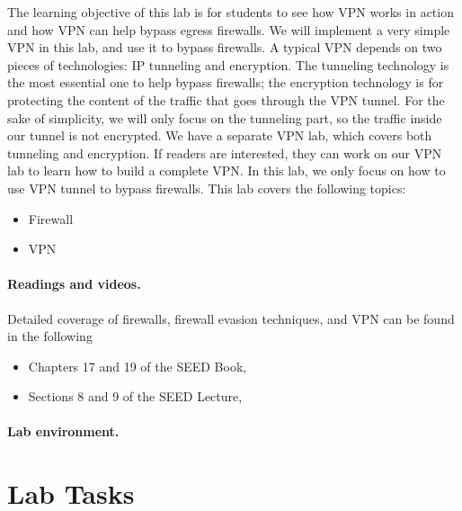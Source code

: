 The learning objective of this lab is for students to see 
how VPN works in action and how VPN can help bypass egress firewalls.     
We will implement a very simple VPN in this lab, and use it to bypass
firewalls. A typical VPN depends on two pieces of technologies: IP tunneling
and encryption. The tunneling technology is the most essential one to help
bypass firewalls; the encryption technology is for protecting the content
of the traffic that goes through the VPN tunnel. 
For the sake of simplicity, we will only focus on the tunneling part,
so the traffic inside our tunnel is not encrypted. We have a separate
VPN lab, which covers both tunneling and encryption. If readers are
interested, they can work on our VPN lab to learn how to build a complete
VPN. In this lab, we only focus on how to use VPN tunnel to bypass firewalls.
This lab covers the following topics:

\begin{itemize}[noitemsep]
\item Firewall
\item VPN
\end{itemize}


\paragraph{Readings and videos.}
Detailed coverage of firewalls, firewall evasion techniques, and VPN can be found in
the following

\begin{itemize}
\item Chapters 17 and 19 of the SEED Book, \seedbook
\item Sections 8 and 9 of the SEED Lecture, \seedisvideo
\end{itemize}


\paragraph{Lab environment.} \seedenvironmentB
 


\section{Lab Tasks}




